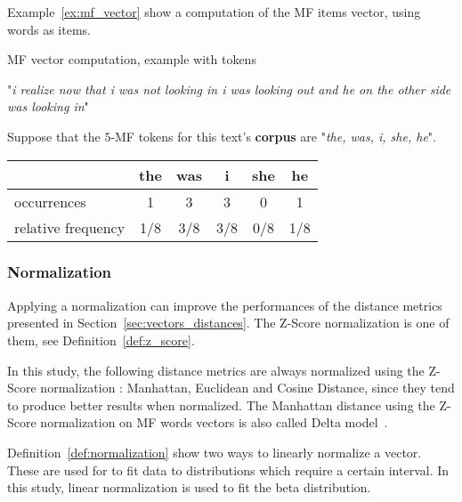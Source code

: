 Example~\ref{ex:mf_vector} show a computation of the MF items vector, using words as items.

\begin{example}
  \centering
  \caption{MF vector computation, example with tokens}
  \label{ex:mf_vector}

  \begin{subexample}{\linewidth}
    "\textit{i realize now that i was not looking in i was looking out and he on the other side was looking in}"\cite{ddlc}
  \end{subexample}

  \vspace{0.5cm}

  \begin{subexample}{\linewidth}
    Suppose that the $5$-MF tokens for this text's \textbf{corpus} are "\textit{the, was, i, she, he}".

    \vspace{0.2cm}
    \centering
    \begin{tabular}{l c c c c c}
      \toprule
                       & the & was & i   & she & he  \\
      \midrule
      occurrences         & 1   & 3   & 3   & 0   & 1   \\
      relative frequency & 1/8 & 3/8 & 3/8 & 0/8 & 1/8 \\
      \bottomrule
    \end{tabular}
  \end{subexample}
\end{example}

\subsubsection{Normalization \label{sec:normalization}}

Applying a normalization can improve the performances of the distance metrics presented in Section~\ref{sec:vectors_distances}.
The Z-Score normalization is one of them, see Definition~\ref{def:z_score}.

In this study, the following distance metrics are always normalized using the Z-Score normalization : Manhattan, Euclidean and Cosine Distance, since they tend to produce better results when normalized.
The Manhattan distance using the Z-Score normalization on MF words vectors is also called Delta model~\cite{savoy_stylo}.

Definition~\ref{def:normalization} show two ways to linearly normalize a vector.
These are used for to fit data to distributions which require a certain interval.
In this study, linear normalization is used to fit the beta distribution.

